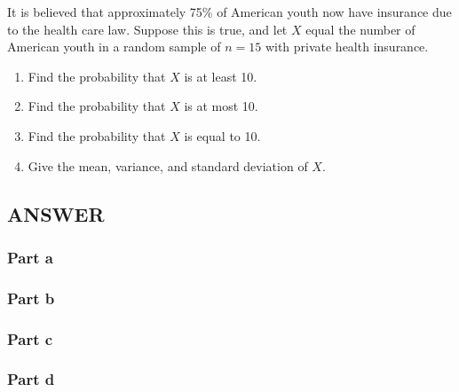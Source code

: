 \documentclass[
  letterpaper,
  DIV=11,
  numbers=noendperiod]{scrartcl}
\providecommand{\tightlist}{%
  \setlength{\itemsep}{0pt}\setlength{\parskip}{0pt}}
\begin{document}
It is believed that approximately 75\% of American youth now have
insurance due to the health care law. Suppose this is true, and let
\(X\) equal the number of American youth in a random sample of
\(n = 15\) with private health insurance.

\begin{enumerate}
\def\labelenumi{\alph{enumi}.}
\tightlist
\item
  Find the probability that \(X\) is at least 10.
\item
  Find the probability that \(X\) is at most 10.
\item
  Find the probability that \(X\) is equal to 10.
\item
  Give the mean, variance, and standard deviation of \(X\).
\end{enumerate}

\subsection{ANSWER}\label{answer-2}

\subsubsection{Part a}\label{part-a-2}

\subsubsection{Part b}\label{part-b-2}

\subsubsection{Part c}\label{part-c-2}

\subsubsection{Part d}\label{part-d-1}
\end{document}
